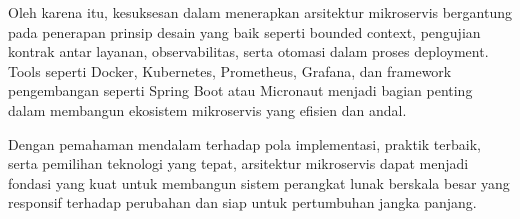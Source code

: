 Oleh karena itu, kesuksesan dalam menerapkan arsitektur mikroservis bergantung pada penerapan prinsip desain yang baik seperti bounded context, pengujian kontrak antar layanan, observabilitas, serta otomasi dalam proses deployment. Tools seperti Docker, Kubernetes, Prometheus, Grafana, dan framework pengembangan seperti Spring Boot atau Micronaut menjadi bagian penting dalam membangun ekosistem mikroservis yang efisien dan andal.

Dengan pemahaman mendalam terhadap pola implementasi, praktik terbaik, serta pemilihan teknologi yang tepat, arsitektur mikroservis dapat menjadi fondasi yang kuat untuk membangun sistem perangkat lunak berskala besar yang responsif terhadap perubahan dan siap untuk pertumbuhan jangka panjang.

